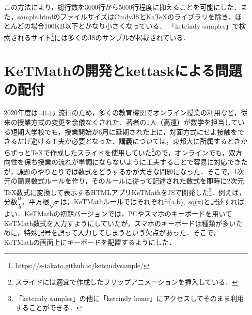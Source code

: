 \documentclass[a4j,12pt]{ujarticle}
\begin{document}
この方法により，総行数を3000行から5000行程度に抑えることを可能にした．また，sample.htmlのファイルサイズはCindyJSとKaTeXのライブラリを除き，ほとんどの場合100KB以下とかなり小さくなっている．
「ketcindy samples」で検索されるサイト\footnote{https://s-takato.github.io/ketcindysample/}には多くの\ketcindy JSのサンプルが掲載されている．

\section{KeTMathの開発とkettaskによる問題の配付}

2020年度はコロナ流行のため，多くの教育機関でオンライン授業の利用など，従来の授業方式の変更を余儀なくされた．著者の1人（高遠）が数学を担当している短期大学校でも，授業開始が6月に延期された上に，対面方式にせよ接触をできるだけ避ける工夫が必要となった．講義については，東邦大に所属するときからずっと\TeX で作成したスライドを使用していた\footnote{スライドには適宜\ketcindy で作成したフリップアニメーションを挿入している．}ので，オンラインでも，双方向性を保ち授業の流れが単調にならないように工夫することで容易に対応できたが，課題のやりとりでは数式をどうするかが大きな問題になった．そこで，1次元の簡易数式ルールを作り，そのルールに従って記述された数式を即時に2次元\TeX 数式に変換して表示するHTMLアプリKeTMathを\ketcindy JSで開発した\footnote{「ketcindy samples」の他に「ketcindy home」にアクセスしてそのまま利用することができる．}．例えば，
分数$\dfrac{a}{b}$，平方根$\sqrt{x}$は，KeTMathルールではそれぞれfr(a,b),\ sq(x)と記述すればよい．KeTMathの初期バージョンでは，PCやスマホのキーボードを用いてKeTMath数式を入力すようにしていたが，スマホのキーボードは種類が多いために，特殊記号を誤って入力してしまうという欠点があった．そこで，KeTMathの画面上にキーボードを配置するようにした．
\end{document}
